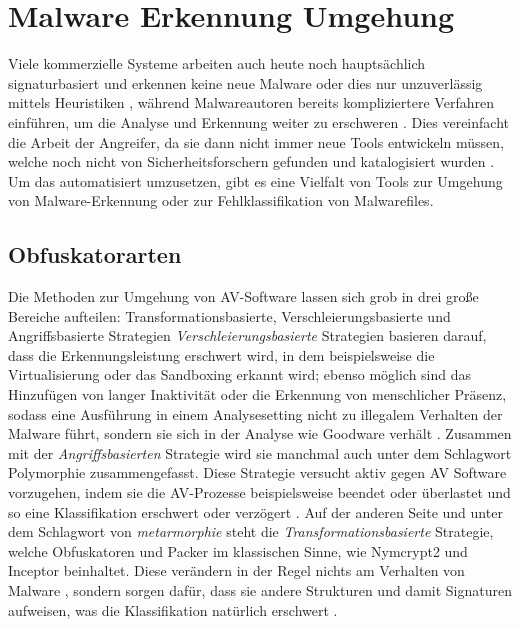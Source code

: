 \section{Malware Erkennung Umgehung}
\label{Sec:MalwareEvasion}
Viele kommerzielle Systeme arbeiten auch heute noch hauptsächlich signaturbasiert und erkennen keine neue Malware oder dies nur unzuverlässig mittels Heuristiken \cite{rathore_2023_breaking}, während Malwareautoren bereits kompliziertere Verfahren einführen, um die Analyse und Erkennung weiter zu erschweren \cite{nunes_2022_bane}. Dies vereinfacht die Arbeit der Angreifer, da sie dann nicht immer neue Tools entwickeln müssen, welche noch nicht von Sicherheitsforschern gefunden und katalogisiert wurden \cite{holm_2023_hide}. Um das automatisiert umzusetzen, gibt es eine Vielfalt von Tools zur Umgehung von Malware-Erkennung oder zur Fehlklassifikation von Malwarefiles.

\subsection{Obfuskatorarten}
Die Methoden zur Umgehung von AV-Software lassen sich grob in drei große Bereiche aufteilen: Transformationsbasierte, Verschleierungsbasierte und Angriffsbasierte Strategien \cite{geng_2024_a}
\textit{Verschleierungsbasierte} Strategien basieren darauf, dass die Erkennungsleistung erschwert wird, in dem beispielsweise die Virtualisierung oder das Sandboxing erkannt wird; ebenso möglich sind das Hinzufügen von langer Inaktivität  oder die Erkennung von menschlicher Präsenz, sodass eine Ausführung in einem Analysesetting nicht zu illegalem Verhalten der Malware führt, sondern sie sich in der Analyse wie Goodware verhält \cite{geng_2024_a}. Zusammen mit der \textit{Angriffsbasierten} Strategie wird sie manchmal auch unter dem Schlagwort Polymorphie \cite{elsersy_2022_the} zusammengefasst. Diese Strategie versucht aktiv gegen AV Software vorzugehen, indem sie die AV-Prozesse beispielsweise beendet oder überlastet und so eine Klassifikation erschwert oder verzögert \cite{geng_2024_a}. 
Auf der anderen Seite und unter dem Schlagwort von \textit{metarmorphie} \cite{elsersy_2022_the} steht die \textit{Transformationsbasierte} Strategie, welche Obfuskatoren und Packer im klassischen Sinne, wie Nymcrypt2 und Inceptor beinhaltet. Diese verändern in der Regel nichts am Verhalten von Malware \cite{wauters_2024_building}, sondern sorgen dafür, dass sie andere Strukturen und damit Signaturen aufweisen, was die Klassifikation natürlich erschwert \cite{geng_2024_a}.


